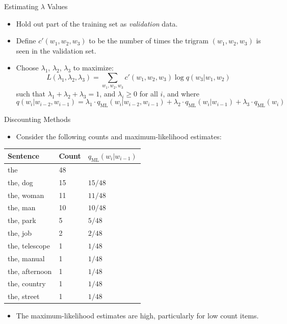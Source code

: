 \documentclass[handout]{beamer}
\begin{document}
\begin{frame}{Estimating $\lambda$ Values}
\scriptsize
\begin{itemize}
  \item Hold out part of the training set as \textit{validation} data.
  \item Define $c'(w_1, w_2, w_3)$ to be the number of times the trigram $(w_1, w_2, w_3)$ is seen in the validation set.
  \item Choose $\lambda_1$, $\lambda_2$, $\lambda_3$ to maximize:
  \[
  L(\lambda_1, \lambda_2, \lambda_3) = \sum_{w_1,w_2,w_3} c'(w_1, w_2, w_3) \log q(w_3 | w_1, w_2)
  \]
  such that $\lambda_1 + \lambda_2 + \lambda_3 = 1$, and $\lambda_i \geq 0$ for all $i$, and where
  \[
  q(w_i | w_{i-2}, w_{i-1}) = \lambda_1 \cdot q_{\text{ML}}(w_i | w_{i-2}, w_{i-1}) + \lambda_2 \cdot q_{\text{ML}}(w_i | w_{i-1}) + \lambda_3 \cdot q_{\text{ML}}(w_i)
  \]
\end{itemize}
\end{frame}



\begin{frame}{Discounting Methods}
\begin{scriptsize}
\begin{itemize}
\item Consider the following counts and maximum-likelihood estimates:
\end{itemize}

\begin{table}[h]
    \centering
    \begin{tabular}{lll}
        \textbf{Sentence} & \textbf{Count} & \textbf{$q_{\text{ML}}(w_i | w_{i-1})$} \\
        \hline
        the & 48 & \\
        the, dog & 15 & $15/48$ \\
        the, woman & 11 & $11/48$ \\
        the, man & 10 & $10/48$ \\
        the, park & 5 & $5/48$ \\
        the, job & 2 & $2/48$ \\
        the, telescope & 1 & $1/48$ \\
        the, manual & 1 & $1/48$ \\
        the, afternoon & 1 & $1/48$ \\
        the, country & 1 & $1/48$ \\
        the, street & 1 & $1/48$ \\
    \end{tabular}
\end{table}

\begin{itemize}
    \item The maximum-likelihood estimates are high, particularly for low count items.
\end{itemize}
\end{scriptsize}
\end{frame}
\end{document}
